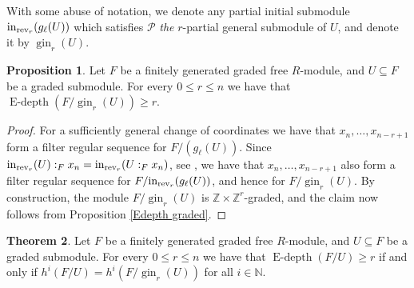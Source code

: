 \documentclass[12pt]{amsart}
\theoremstyle{definition}
\newtheorem{theorem}{Theorem}[section]
\newtheorem{proposition}[theorem]{Proposition}
\theoremstyle{definition}
\def\NZQ{\mathbb}               %
\def\NN{{\NZQ N}}
\def\ZZ{{\NZQ Z}}
\renewcommand{\leq}{\leqslant}
\renewcommand{\geq}{\geqslant}
\DeclareMathOperator{\Edepth}{E-depth}
\DeclareMathOperator{\rev}{rev}
\DeclareMathOperator{\gin}{gin}
\begin{document}
With some abuse of notation,  we denote any partial initial submodule ${\rm in}_{\rev_r}(g_\ell(U))$ which satisfies  {\bf {$\mathcal P$}} {\it the} $r$-partial general submodule of $U$, and denote it by $\gin_r(U)$.


\begin{proposition} \label{prop gin and grading}
Let $F$ be a finitely generated graded free $R$-module, and $U \subseteq F$ be a graded submodule. For every $0 \leq r \leq n$ we have that $\Edepth(F/\gin_r(U)) \geq r$.
\end{proposition}
\begin{proof}
For a sufficiently general change of coordinates we have that $x_n,\ldots,x_{n-r+1}$ form a filter regular sequence for $F/(g_\ell(U))$. Since ${\rm in}_{\rev_r}(U):_Fx_n = {\rm in}_{\rev_r}(U:_Fx_n)$, see \cite[15.7]{Eis95}, we have that $x_n,\ldots,x_{n-r+1}$ also form a filter regular sequence for $F/{\rm in}_{\rev_r}(g_\ell(U))$, and hence for $F/\gin_r(U)$. By construction, the module $F/\gin_r(U)$ is $\ZZ \times \ZZ^r$-graded, and the claim now follows from Proposition \ref{Edepth graded}.
\end{proof}
 


\begin{theorem} \label{main thm Edepth}
Let $F$ be a finitely generated graded free $R$-module, and $U \subseteq F$ be a graded submodule. For every $0 \leq r \leq n$ we have that $\Edepth(F/U) \geq r$ if and only if $h^i(F/U) = h^i(F/\gin_r(U))$ for all $i \in \NN$.
\end{theorem}
\end{document}
